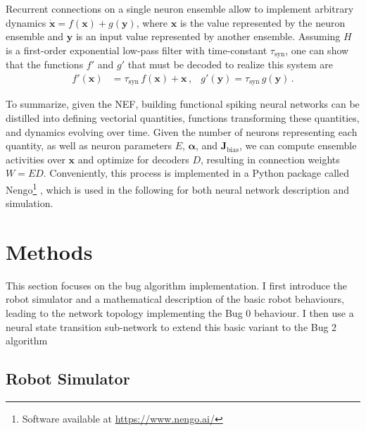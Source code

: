 \documentclass[letterpaper,10pt,conference]{ieeeconf}
\renewcommand{\vec}[1]{\bm{#1}}
\begin{document}
Recurrent connections on a single neuron ensemble allow to implement arbitrary dynamics $\dot {\vec x} = f(\vec x) + g(\vec y)$, where $\vec x$ is the value represented by the neuron ensemble and $\vec y$ is an input value represented by another ensemble. Assuming $H$ is a first-order exponential low-pass filter with time-constant $\tau_\mathrm{syn}$, one can show that the functions $f'$ and $g'$ that must be decoded to realize this system are
\begin{align*}
	f'(\vec x) &= \tau_\mathrm{syn} \, f(\vec x) + \vec x \,, & g'(\vec y) = \tau_\mathrm{syn} \, g(\vec y) \,.
\end{align*}

To summarize, given the NEF, building functional spiking neural networks can be distilled into defining vectorial quantities, functions transforming these quantities, and dynamics evolving over time. Given the number of neurons representing each quantity, as well as neuron parameters $E$, $\vec \alpha$, and $\vec J_\mathrm{bias}$, we can compute ensemble activities over $\vec x$ and optimize for decoders $D$, resulting in connection weights $W = ED$. Conveniently, this process is implemented in a Python package called Nengo\footnote{Software available at \url{https://www.nengo.ai/}} \cite{bekolay2014nengo}, which is used  in the following for both neural network description and simulation.

\section{Methods}
\label{sec:methods}

This section focuses on the bug algorithm implementation. I first introduce the robot simulator and a mathematical description of the basic robot behaviours, leading to the network topology implementing the Bug 0 behaviour. I then use a neural state transition sub-network to extend this basic variant to the Bug 2 algorithm 

\subsection{Robot Simulator}
\end{document}

